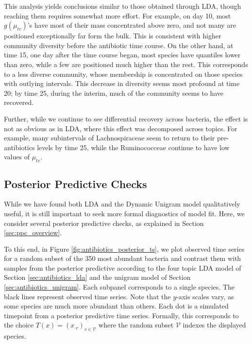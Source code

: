 \documentclass{article}
\begin{document}
This analysis yields conclusions similar to those obtained through LDA, though
reaching them requires somewhat more effort. For example, on day 10, most
$g\left(\mu_{tv}\right)$'s have most of their mass concentrated above zero, and
not many are positioned exceptionally far form the bulk. This is consistent with
higher community diversity before the antibiotic time course. On the other hand,
at time 15, one day after the time course began, most species have quantiles
lower than zero, while a few are positioned much higher than the rest. This
corresponds to a less diverse community, whose membership is concentrated on
those species with outlying intervals. This decrease in diversity seems most
profound at time 20; by time 25, during the interim, much of the community seems
to have recovered.

Further, while we continue to see differential recovery across bacteria, the
effect is not as obvious as in LDA, where this effect was decomposed across
topics. For example, many subintervals of Lachnospiraceae seem to return to
their pre-antibiotics levels by time 25, while the Ruminococceae continue to
have low values of $\mu_{tv}$.

\subsection{Posterior Predictive Checks}
\label{sec:antibiotics_ppc}

While we have found both LDA and the Dynamic Unigram model qualitatively useful,
it is still important to seek more formal diagnostics of model fit. Here, we
consider several posterior predictive checks, as explained in Section
\ref{sec:ppc_overview}.

To this end, in Figure \ref{fig:antibiotics_posterior_ts}, we plot observed time
series for a random subset of the 350 most abundant bacteria and contrast them
with samples from the posterior predictive according to the four topic LDA model
of Section \ref{sec:antibiotics_lda} and the unigram model of Section
\ref{sec:antibiotics_unigram}. Each subpanel corresponds to a single species. The
black lines represent observed time series. Note that the $y$-axis scales vary,
as some species are much more abundant than others. Each dot is a simulated
timepoint from a posterior predictive time series. Formally, this corresponds to
the choice $T\left(x\right) = \left(x_{\cdot v}\right)_{v \in \mathcal{V}}$
where the random subset $\mathcal{V}$ indexes the displayed species.
\end{document}
